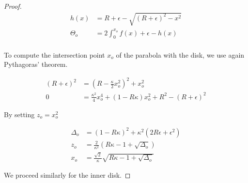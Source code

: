 \begin{proof}
\begin{align*}
	h(x) &= R+\epsilon - \sqrt{ (R+\epsilon)^2 - x^2}\\
	\Theta_o &= 2\int_0^{x_o}{f(x) + \epsilon - h(x)}\\
\end{align*}

To compute the intersection point $x_o$ of the parabola with the disk, we use again Pythagoras' theorem.

\begin{align*}
	(R+\epsilon)^2 &= (R-\frac{\kappa}{2}x_o^2)^2 + x_o^2\\
	0 &= \frac{\kappa^2}{4}x_o^4 + (1-R\kappa)x_o^2 + R^2 - (R+\epsilon)^2
\end{align*}

By setting $z_o=x_o^2$

\begin{align*}
\Delta_o &= (1-R\kappa)^2 + \kappa^2(2R\epsilon + \epsilon^2)\\
z_o &= \frac{2}{\kappa^2}(R\kappa-1 + \sqrt{\Delta_o})\\
x_o &= \frac{\sqrt{2}}{\kappa}\sqrt{R\kappa-1+\sqrt{\Delta_o}}
\end{align*}

We proceed similarly for the inner disk.



\end{proof}
